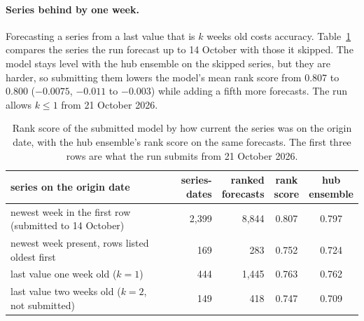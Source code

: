 \documentclass[11pt,a4paper]{article}
\numberwithin{equation}{section}
\begin{document}
\paragraph{Series behind by one week.} Forecasting a series from a last value that is $k$ weeks old
costs accuracy. Table~\ref{tab:stale} compares the series the run forecast up to 14 October with those it
skipped. The model stays level with the hub ensemble on the skipped series, but they are harder, so
submitting them lowers the model's mean rank score from 0.807 to 0.800 ($-0.0075$, $-0.011$ to
$-0.003$) while adding a fifth more forecasts. The run allows $k\le1$ from 21 October 2026.

\begin{table}[htbp]
\centering\small
\begin{tabular}{@{}lrrcc@{}}
\toprule
series on the origin date & series-dates & \makecell[r]{ranked\\forecasts} & \makecell{rank\\score} & \makecell{hub\\ensemble} \\
\midrule
newest week in the first row (submitted to 14 October) & 2,399 & 8,844 & 0.807 & 0.797 \\
newest week present, rows listed oldest first & 169 & 283 & 0.752 & 0.724 \\
last value one week old ($k=1$) & 444 & 1,445 & 0.763 & 0.762 \\
last value two weeks old ($k=2$, not submitted) & 149 & 418 & 0.747 & 0.709 \\
\bottomrule
\end{tabular}
\caption{Rank score of the submitted model by how current the series was on the origin date, with the
hub ensemble's rank score on the same forecasts. The first three rows are what the run submits from
21 October 2026.}
\label{tab:stale}
\end{table}
\end{document}
